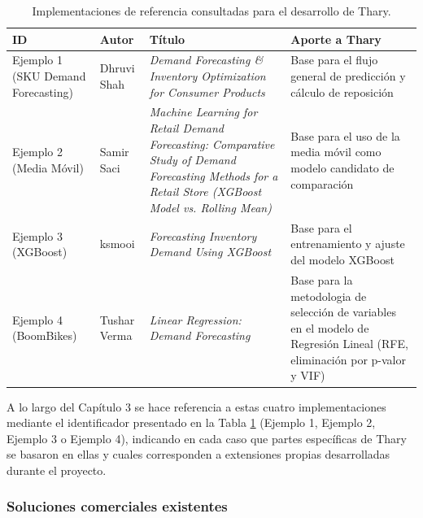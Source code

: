 \begin{table}[H]
    \centering
    \caption{Implementaciones de referencia consultadas para el desarrollo de Thary.}
    \label{tab:implementaciones_referencia}
    \renewcommand{\arraystretch}{1.3}
    \begin{tabularx}{\textwidth}{|l|p{2.2cm}|X|X|}
    \hline
    \textbf{ID} & \textbf{Autor} & \textbf{Título} & \textbf{Aporte a Thary} \\
    \hline
    Ejemplo 1 (SKU Demand Forecasting) & Dhruvi Shah \cite{ejemplo1_demandforecast} & \textit{Demand Forecasting \& Inventory Optimization for Consumer Products} & Base para el flujo general de predicción y cálculo de reposición \\
    \hline
    Ejemplo 2 (Media Móvil) & Samir Saci \cite{ejemplo2_saci2020mlretail} & \textit{Machine Learning for Retail Demand Forecasting: Comparative Study of Demand Forecasting Methods for a Retail Store (XGBoost Model vs. Rolling Mean)} & Base para el uso de la media móvil como modelo candidato de comparación \\
    \hline
    Ejemplo 3 (XGBoost) & ksmooi \cite{ejemplo3_ksmooi_inventorydemand} & \textit{Forecasting Inventory Demand Using XGBoost} & Base para el entrenamiento y ajuste del modelo XGBoost \\
    \hline
    Ejemplo 4 (BoomBikes) & Tushar Verma \cite{ejemplo4_boombikes} & \textit{Linear Regression: Demand Forecasting} & Base para la metodologia de selección de variables en el modelo de Regresión Lineal (RFE, eliminación por p-valor y VIF) \\
    \hline
    \end{tabularx}
\end{table}

A lo largo del Capítulo 3 se hace referencia a estas cuatro implementaciones
mediante el identificador presentado en la Tabla \ref{tab:implementaciones_referencia} (Ejemplo 1, Ejemplo 2, Ejemplo 3 o Ejemplo 4),
indicando en cada caso que partes específicas de Thary se basaron en ellas y
cuales corresponden a extensiones propias desarrolladas durante el proyecto.

\subsubsection{Soluciones comerciales existentes}

